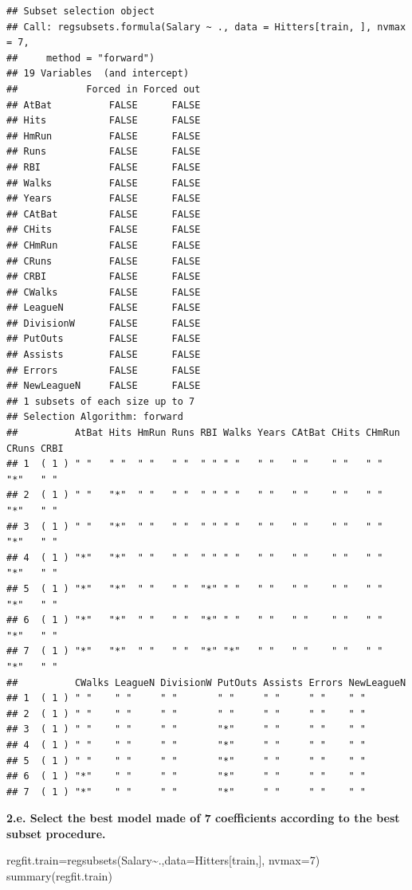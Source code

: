 \documentclass[
]{article}
\newenvironment{Shaded}{\begin{snugshade}}{\end{snugshade}}
\newcommand{\AttributeTok}[1]{\textcolor[rgb]{0.77,0.63,0.00}{#1}}
\newcommand{\DecValTok}[1]{\textcolor[rgb]{0.00,0.00,0.81}{#1}}
\newcommand{\FunctionTok}[1]{\textcolor[rgb]{0.00,0.00,0.00}{#1}}
\newcommand{\NormalTok}[1]{#1}
\newcommand{\OtherTok}[1]{\textcolor[rgb]{0.56,0.35,0.01}{#1}}
\newcommand{\SpecialCharTok}[1]{\textcolor[rgb]{0.00,0.00,0.00}{#1}}
\begin{document}
\begin{verbatim}
## Subset selection object
## Call: regsubsets.formula(Salary ~ ., data = Hitters[train, ], nvmax = 7, 
##     method = "forward")
## 19 Variables  (and intercept)
##            Forced in Forced out
## AtBat          FALSE      FALSE
## Hits           FALSE      FALSE
## HmRun          FALSE      FALSE
## Runs           FALSE      FALSE
## RBI            FALSE      FALSE
## Walks          FALSE      FALSE
## Years          FALSE      FALSE
## CAtBat         FALSE      FALSE
## CHits          FALSE      FALSE
## CHmRun         FALSE      FALSE
## CRuns          FALSE      FALSE
## CRBI           FALSE      FALSE
## CWalks         FALSE      FALSE
## LeagueN        FALSE      FALSE
## DivisionW      FALSE      FALSE
## PutOuts        FALSE      FALSE
## Assists        FALSE      FALSE
## Errors         FALSE      FALSE
## NewLeagueN     FALSE      FALSE
## 1 subsets of each size up to 7
## Selection Algorithm: forward
##          AtBat Hits HmRun Runs RBI Walks Years CAtBat CHits CHmRun CRuns CRBI
## 1  ( 1 ) " "   " "  " "   " "  " " " "   " "   " "    " "   " "    "*"   " " 
## 2  ( 1 ) " "   "*"  " "   " "  " " " "   " "   " "    " "   " "    "*"   " " 
## 3  ( 1 ) " "   "*"  " "   " "  " " " "   " "   " "    " "   " "    "*"   " " 
## 4  ( 1 ) "*"   "*"  " "   " "  " " " "   " "   " "    " "   " "    "*"   " " 
## 5  ( 1 ) "*"   "*"  " "   " "  "*" " "   " "   " "    " "   " "    "*"   " " 
## 6  ( 1 ) "*"   "*"  " "   " "  "*" " "   " "   " "    " "   " "    "*"   " " 
## 7  ( 1 ) "*"   "*"  " "   " "  "*" "*"   " "   " "    " "   " "    "*"   " " 
##          CWalks LeagueN DivisionW PutOuts Assists Errors NewLeagueN
## 1  ( 1 ) " "    " "     " "       " "     " "     " "    " "       
## 2  ( 1 ) " "    " "     " "       " "     " "     " "    " "       
## 3  ( 1 ) " "    " "     " "       "*"     " "     " "    " "       
## 4  ( 1 ) " "    " "     " "       "*"     " "     " "    " "       
## 5  ( 1 ) " "    " "     " "       "*"     " "     " "    " "       
## 6  ( 1 ) "*"    " "     " "       "*"     " "     " "    " "       
## 7  ( 1 ) "*"    " "     " "       "*"     " "     " "    " "
\end{verbatim}

\textbf{2.e. Select the best model made of 7 coefficients according to
the best subset procedure.}

\begin{Shaded}
\begin{Highlighting}[]
\NormalTok{regfit.train}\OtherTok{=}\FunctionTok{regsubsets}\NormalTok{(Salary}\SpecialCharTok{\textasciitilde{}}\NormalTok{.,}\AttributeTok{data=}\NormalTok{Hitters[train,], }\AttributeTok{nvmax=}\DecValTok{7}\NormalTok{)}
\FunctionTok{summary}\NormalTok{(regfit.train)}
\end{Highlighting}
\end{Shaded}
\end{document}
